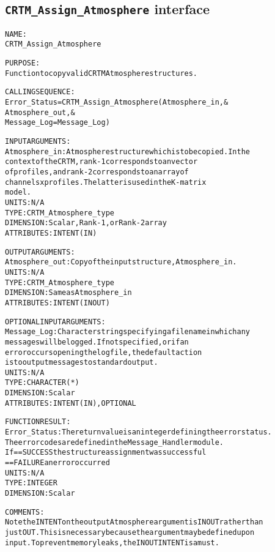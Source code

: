 \subsection{\texttt{CRTM\_Assign\_Atmosphere} interface}
  \label{sec:CRTM_Assign_Atmosphere_interface}
  \begin{alltt}
 
  NAME:
        CRTM_Assign_Atmosphere
 
  PURPOSE:
        Function to copy valid CRTM Atmosphere structures.
 
  CALLING SEQUENCE:
        Error_Status = CRTM_Assign_Atmosphere( Atmosphere_in          , &
                                               Atmosphere_out         , &
                                               Message_Log=Message_Log  )
 
  INPUT ARGUMENTS:
        Atmosphere_in:   Atmosphere structure which is to be copied. In the
                         context of the CRTM, rank-1 corresponds to an vector
                         of profiles, and rank-2 corresponds to an array of
                         channels x profiles. The latter is used in the K-matrix
                         model.
                         UNITS:      N/A
                         TYPE:       CRTM_Atmosphere_type
                         DIMENSION:  Scalar, Rank-1, or Rank-2 array
                         ATTRIBUTES: INTENT(IN)
 
  OUTPUT ARGUMENTS:
        Atmosphere_out:  Copy of the input structure, Atmosphere_in.
                         UNITS:      N/A
                         TYPE:       CRTM_Atmosphere_type
                         DIMENSION:  Same as Atmosphere_in
                         ATTRIBUTES: INTENT(IN OUT)
 
  OPTIONAL INPUT ARGUMENTS:
        Message_Log:     Character string specifying a filename in which any
                         messages will be logged. If not specified, or if an
                         error occurs opening the log file, the default action
                         is to output messages to standard output.
                         UNITS:      N/A
                         TYPE:       CHARACTER(*)
                         DIMENSION:  Scalar
                         ATTRIBUTES: INTENT(IN), OPTIONAL
 
  FUNCTION RESULT:
        Error_Status:    The return value is an integer defining the error status.
                         The error codes are defined in the Message_Handler module.
                         If == SUCCESS the structure assignment was successful
                            == FAILURE an error occurred
                         UNITS:      N/A
                         TYPE:       INTEGER
                         DIMENSION:  Scalar
 
  COMMENTS:
        Note the INTENT on the output Atmosphere argument is IN OUT rather than
        just OUT. This is necessary because the argument may be defined upon
        input. To prevent memory leaks, the IN OUT INTENT is a must.
 
  \end{alltt}
